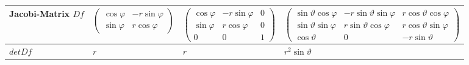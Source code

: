 \begin{tabular}{|p{2.5cm}||p{3cm}|p{4.2cm}|p{7.5cm}|}
	\hline
	Jacobi-Matrix $Df$ &
	\begin{minipage}{3cm}
    \vspace{0.1cm}
		$\begin{pmatrix}
         	\cos\varphi & -r\sin\varphi\\
         	\sin\varphi & r\cos\varphi
         \end{pmatrix}$
    \vspace{0.1cm}
    \end{minipage}&	
	\begin{minipage}{4.2cm}
    \vspace{0.1cm}
		$\begin{pmatrix}
         	\cos\varphi & -r\sin\varphi & 0\\
         	\sin\varphi & r\cos\varphi & 0\\
         	0 & 0 & 1
         \end{pmatrix}$
    \vspace{0.1cm}
    \end{minipage}&	
	\begin{minipage}{7.5cm}
    \vspace{0.1cm}
		$\begin{pmatrix}
         	\sin\vartheta\cos\varphi & -r\sin\vartheta\sin\varphi &
         	r\cos\vartheta\cos\varphi\\
         	\sin\vartheta\sin\varphi & r\sin\vartheta\cos\varphi &
         	r\cos\vartheta\sin\varphi\\
         	\cos\vartheta & 0 & -r\sin\vartheta
         \end{pmatrix}$
    \vspace{0.1cm}
    \end{minipage}\\
	\hline
	\begin{minipage}{2.5cm}
    	\vspace{0.1cm}
  		$detDf$   
  		\vspace{0.1cm}
    \end{minipage}&
		$r$ &
		$r$ &
		$r^2\sin\vartheta$\\
	\hline	
\end{tabular}